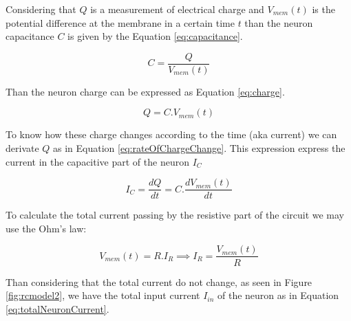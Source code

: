			
			\par Considering that $Q$ is a measurement of electrical charge and $V_{mem}(t)$ is the potential difference at the membrane in a certain time $t$ than the neuron capacitance $C$ is given by the Equation \ref{eq:capacitance}.
			
			\begin{equation}
				\label{eq:capacitance}
				C = \frac{Q}{V_{mem}(t)}
			\end{equation}
			
			\par Than the neuron charge can be expressed as Equation \ref{eq:charge}.
			
			\begin{equation}
				\label{eq:charge}
				Q = C.V_{mem}(t)
			\end{equation}
		
			\par To know how these charge changes according to the time (aka current) we can derivate $Q$ as in Equation \ref{eq:rateOfChargeChange}. This expression express the current in the capacitive part of the neuron $I_C$
			
			\begin{equation}
				\label{eq:rateOfChargeChange}
				I_C = \dfrac{dQ}{dt} = C. \dfrac{dV_{mem}(t)}{dt}
			\end{equation}
		
		
			\par To calculate the total current passing by the resistive part of the circuit we may use the Ohm's law:
			
			\begin{equation}
				\label{eq:ohmlaw}
				V_{mem}(t) = R.I_R \implies I_R = \frac{V_{mem}(t)}{R}
			\end{equation}
			
			\par Than considering that the total current do not change, as seen in Figure \ref{fig:rcmodel2}, we have the total input current $I_{in}$ of the neuron as in Equation \ref{eq:totalNeuronCurrent}.
			
